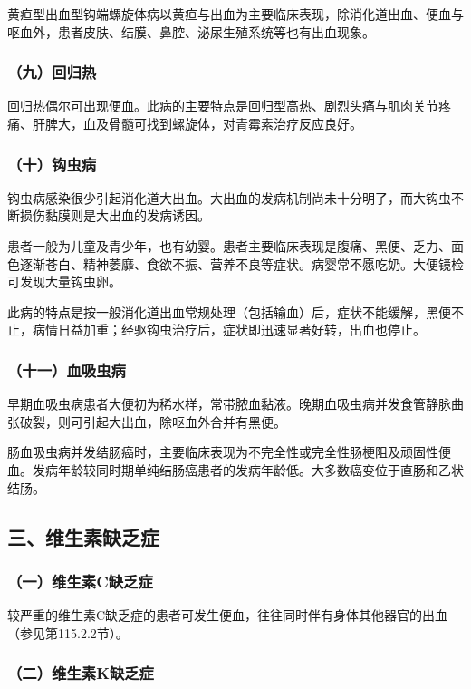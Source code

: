 黄疸型出血型钩端螺旋体病以黄疸与出血为主要临床表现，除消化道出血、便血与呕血外，患者皮肤、结膜、鼻腔、泌尿生殖系统等也有出血现象。

\subsubsection{（九）回归热}

回归热偶尔可出现便血。此病的主要特点是回归型高热、剧烈头痛与肌肉关节疼痛、肝脾大，血及骨髓可找到螺旋体，对青霉素治疗反应良好。

\subsubsection{（十）钩虫病}

钩虫病感染很少引起消化道大出血。大出血的发病机制尚未十分明了，而大钩虫不断损伤黏膜则是大出血的发病诱因。

患者一般为儿童及青少年，也有幼婴。患者主要临床表现是腹痛、黑便、乏力、面色逐渐苍白、精神萎靡、食欲不振、营养不良等症状。病婴常不愿吃奶。大便镜检可发现大量钩虫卵。

此病的特点是按一般消化道出血常规处理（包括输血）后，症状不能缓解，黑便不止，病情日益加重；经驱钩虫治疗后，症状即迅速显著好转，出血也停止。

\subsubsection{（十一）血吸虫病}

早期血吸虫病患者大便初为稀水样，常带脓血黏液。晚期血吸虫病并发食管静脉曲张破裂，则可引起大出血，除呕血外合并有黑便。

肠血吸虫病并发结肠癌时，主要临床表现为不完全性或完全性肠梗阻及顽固性便血。发病年龄较同时期单纯结肠癌患者的发病年龄低。大多数癌变位于直肠和乙状结肠。

\subsection{三、维生素缺乏症}

\subsubsection{（一）维生素C缺乏症}

较严重的维生素C缺乏症的患者可发生便血，往往同时伴有身体其他器官的出血（参见第115.2.2节）。

\subsubsection{（二）维生素K缺乏症}

